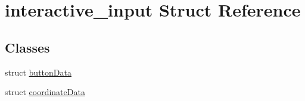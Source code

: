\hypertarget{structinteractive__input}{}\section{interactive\+\_\+input Struct Reference}
\label{structinteractive__input}
\subsection*{Classes}
\begin{DoxyCompactItemize}
\item 
struct \mbox{\hyperlink{structinteractive__input_1_1button_data}{button\+Data}}
\item 
struct \mbox{\hyperlink{structinteractive__input_1_1coordinate_data}{coordinate\+Data}}
\end{DoxyCompactItemize}
